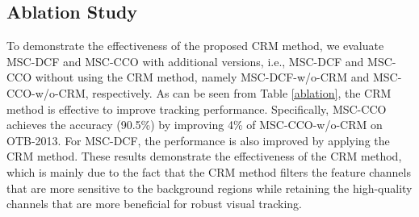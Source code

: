 \documentclass[runningheads]{llncs}
\begin{document}


\subsection{Ablation Study} %
To demonstrate the effectiveness of the proposed CRM method, we evaluate MSC-DCF and MSC-CCO with additional versions, i.e., MSC-DCF and MSC-CCO without using the CRM method, namely MSC-DCF-w/o-CRM and MSC-CCO-w/o-CRM, respectively. As can be seen from Table \ref{ablation}, the CRM method is effective to improve tracking performance. Specifically, MSC-CCO achieves the accuracy (90.5\%) by improving 4\% of MSC-CCO-w/o-CRM on OTB-2013. For MSC-DCF, the performance is also improved by applying the CRM method. These results demonstrate the effectiveness of the CRM method, which is mainly due to the fact that the CRM method filters the feature channels that are more sensitive to the background regions while retaining the high-quality channels that are more beneficial for robust visual tracking. 
\end{document}

